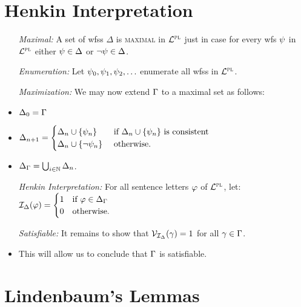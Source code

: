 \documentclass[a4paper, 11pt]{article} %
\begin{document}
\section*{Henkin Interpretation}

\begin{itemize}
  \item[\it Maximal:] A set of wfss $\Delta$ is \textsc{maximal} in $\mathcal{L}^{\textsc{pl}}$ just in case for every wfs $\psi$ in $\mathcal{L}^{\textsc{pl}}$ either $\psi\in\Delta$ or $\neg\psi\in\Delta$.
  \item[\it Enumeration:] Let $\psi_0,\psi_1,\psi_2,\ldots$ enumerate all wfss in $\mathcal{L}^{\textsc{pl}}$.
  \item[\it Maximization:] We may now extend $\Gamma$ to a maximal set as follows: 
    \item $\Delta_0 = \Gamma$
    \item $\Delta_{n+1} =
      \begin{cases}
        \Delta_n\cup\lbrace\psi_n\rbrace      & \text{ if } \Delta_n\cup\lbrace\psi_n\rbrace \text{ is consistent}\\
        \Delta_n\cup\lbrace\neg\psi_n\rbrace  & \text{ otherwise}.
      \end{cases}$
    \item $\Delta_{\Gamma} = \bigcup_{i\in\mathbb{N}}\Delta_n$. 
  \item[\it Henkin Interpretation:] For all sentence letters $\varphi$ of $\mathcal{L}^{\textsc{pl}}$, let:~~ $\mathcal{I}_{\Delta}(\varphi) = 
    \begin{cases}
      1 & \text{if } \varphi \in \Delta_{\Gamma}\\
      0 & \text{otherwise.}
    \end{cases}$
  \item[\it Satisfiable:] It remains to show that $\mathcal{V}_{\mathcal{I}_{\Delta}}(\gamma) = 1$ for all $\gamma \in \Gamma$. 
    \item This will allow us to conclude that $\Gamma$ is satisfiable.  
\end{itemize}





\section*{Lindenbaum's Lemmas}
\end{document}
